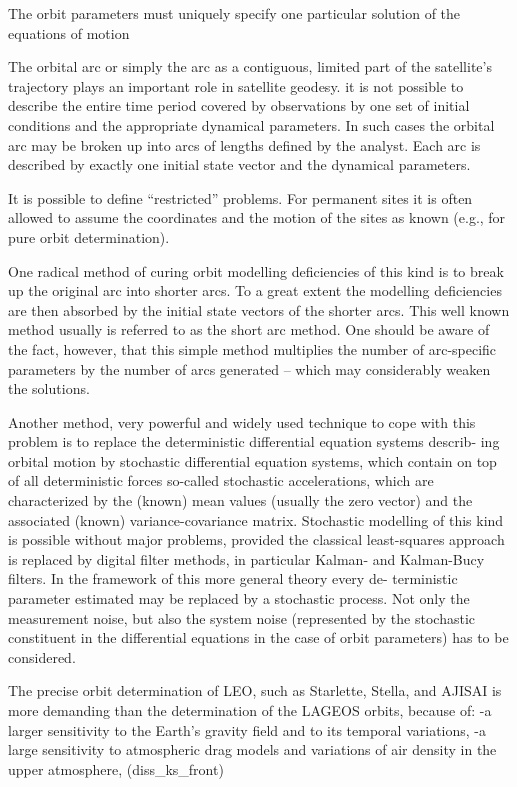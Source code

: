 The orbit parameters must uniquely specify one particular solution of the
equations of motion


The orbital arc or simply the arc as a contiguous, limited part of the satellite’s
trajectory plays an important role in satellite geodesy. it is not possible to describe the
entire time period covered by observations by one set of initial conditions
and the appropriate dynamical parameters. In such cases the orbital arc
may be broken up into arcs of lengths deﬁned by the analyst. Each arc is
described by exactly one initial state vector and the dynamical parameters.

It is possible to deﬁne “restricted” problems. For permanent sites it is often
allowed to assume the coordinates and the motion of the sites as known
(e.g., for pure orbit determination).

One radical method of curing orbit modelling deﬁciencies of this kind is to
break up the original arc into shorter arcs. To a great extent the modelling
deﬁciencies are then absorbed by the initial state vectors of the shorter arcs.
This well known method usually is referred to as the short arc method. One
should be aware of the fact, however, that this simple method multiplies the
number of arc-speciﬁc parameters by the number of arcs generated – which
may considerably weaken the solutions.

Another method, very powerful and widely used technique to cope with this
problem is to replace the deterministic diﬀerential equation systems describ-
ing orbital motion by stochastic diﬀerential equation systems, which contain
on top of all deterministic forces so-called stochastic accelerations, which are
characterized by the (known) mean values (usually the zero vector) and the
associated (known) variance-covariance matrix. Stochastic modelling of this
kind is possible without major problems, provided the classical least-squares
approach is replaced by digital ﬁlter methods, in particular Kalman- and
Kalman-Bucy ﬁlters. In the framework of this more general theory every de-
terministic parameter estimated may be replaced by a stochastic process.
Not only the measurement noise, but also the system noise (represented by
the stochastic constituent in the diﬀerential equations in the case of orbit
parameters) has to be considered.

The precise orbit determination of LEO, such as Starlette, Stella, and AJISAI is more
demanding than the determination of the LAGEOS orbits, because of:
-a larger sensitivity to the Earth’s gravity field and to its temporal variations,
-a large sensitivity to atmospheric drag models and variations of air density in the
upper atmosphere, (diss_ks_front)

